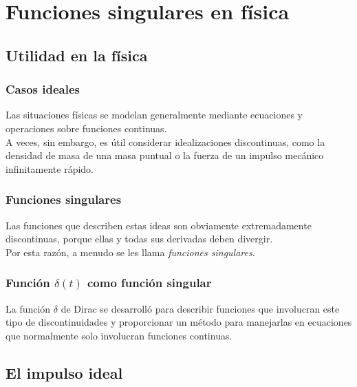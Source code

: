 \documentclass[12pt]{beamer}
\begin{document}
\section{Funciones singulares en física}
\subsection{Utilidad en la física}

\begin{frame}
\frametitle{Casos ideales}
Las situaciones físicas se modelan generalmente mediante ecuaciones y operaciones sobre funciones continuas.
\\
\bigskip
\pause
A veces, sin embargo, es útil considerar idealizaciones discontinuas, como la densidad de masa de una masa puntual o la fuerza de un impulso mecánico infinitamente rápido.
\end{frame}
\begin{frame}
\frametitle{Funciones singulares}
Las funciones que describen estas ideas son obviamente extremadamente discontinuas, porque ellas y todas sus derivadas deben divergir.
\\
\bigskip
\pause
Por esta razón, a menudo se les llama \emph{funciones singulares}.
\end{frame}
\begin{frame}
\frametitle{Función $\delta(t)$ como función singular}
La función $\delta$ de Dirac se desarrolló para describir funciones que involucran este tipo de discontinuidades y proporcionar un método para manejarlas en ecuaciones que normalmente solo involucran funciones continuas.
\end{frame}

\subsection{El impulso ideal}
\end{document}
